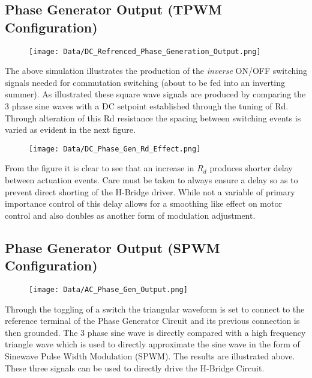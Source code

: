 \documentclass[12pt]{article}
\begin{document}
\begin{appendices}
\subsection{Phase Generator Output (TPWM Configuration)}%
\begin{figure}[H]
\centering
\texttt{[image: Data/DC\_Refrenced\_Phase\_Generation\_Output.png]}
\label{Triangle_Gen_Output}
\end{figure}

The above simulation illustrates the production of the \emph{inverse} ON/OFF switching signals needed for commutation switching (about to be fed into an inverting summer). As illustrated these square wave signals are produced by comparing the 3 phase sine waves with a DC setpoint established through the tuning of Rd. Through alteration of this Rd resistance the spacing between switching events is varied as evident in the next figure.

\begin{figure}[H]
\centering
\texttt{[image: Data/DC\_Phase\_Gen\_Rd\_Effect.png]}
\label{Triangle_Gen_Output}
\end{figure}

From the figure it is clear to see that an increase in $R_d$ produces shorter delay between actuation events. Care must be taken to always ensure a delay so as to prevent direct shorting of the H-Bridge driver. While not a variable of primary importance control of this delay allows for a smoothing like effect on motor control and also doubles as another form of modulation adjustment.

\subsection{Phase Generator Output (SPWM Configuration)}%
\begin{figure}[H]
\centering
\texttt{[image: Data/AC\_Phase\_Gen\_Output.png]}
\label{Triangle_Gen_Output}
\end{figure}

Through the toggling of a switch the triangular waveform is set to connect to the reference terminal of the Phase Generator Circuit and its previous connection is then grounded. The 3 phase sine wave is directly compared with a high frequency triangle wave which is used to directly approximate the sine wave in the form of Sinewave Pulse Width Modulation (SPWM). The results are illustrated above.  These three signals can be used to directly drive the H-Bridge Circuit.


\end{appendices}
\end{document}
